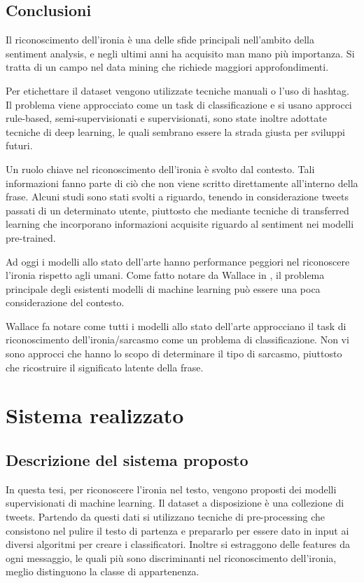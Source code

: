 \documentclass[oneside]{book}
\begin{document}
\section{Conclusioni}
Il riconoscimento dell'ironia è una delle sfide principali nell'ambito della sentiment analysis, e negli ultimi anni ha acquisito man mano più importanza. Si tratta di un campo nel data mining che richiede maggiori approfondimenti.

Per etichettare il dataset vengono utilizzate tecniche manuali o l'uso di hashtag. Il problema viene approcciato come un task di classificazione e si usano approcci rule-based, semi-supervisionati e supervisionati, sono state inoltre adottate tecniche di deep learning, le quali sembrano essere la strada giusta per sviluppi futuri.

Un ruolo chiave nel riconoscimento dell'ironia è svolto dal contesto. Tali informazioni fanno parte di ciò che non viene scritto direttamente all'interno della frase. Alcuni studi sono stati svolti a riguardo, tenendo in considerazione tweets passati di un determinato utente, piuttosto che mediante tecniche di transferred learning che incorporano informazioni acquisite riguardo al sentiment nei modelli pre-trained.

Ad oggi i modelli allo stato dell'arte hanno performance peggiori nel riconoscere l'ironia rispetto agli umani. Come fatto notare da Wallace in \cite{survey4}, il problema principale degli esistenti modelli di machine learning può essere una poca considerazione del contesto.

Wallace fa notare come tutti i modelli allo stato dell'arte approcciano il task di riconoscimento dell'ironia/sarcasmo come un problema di classificazione. Non vi sono approcci che hanno lo scopo di determinare il tipo di sarcasmo, piuttosto che ricostruire il significato latente della frase.

\chapter{Sistema realizzato}

\section{Descrizione del sistema proposto}
In questa tesi, per riconoscere l'ironia nel testo, vengono proposti dei modelli supervisionati di machine learning.
Il dataset a disposizione è una collezione di tweets. Partendo da questi dati si utilizzano tecniche di pre-processing che consistono nel pulire il testo di partenza e prepararlo per essere dato in input ai diversi algoritmi per creare i classificatori. Inoltre si estraggono delle features da ogni messaggio, le quali più sono discriminanti nel riconoscimento dell'ironia, meglio distinguono la classe di appartenenza.
\end{document}
